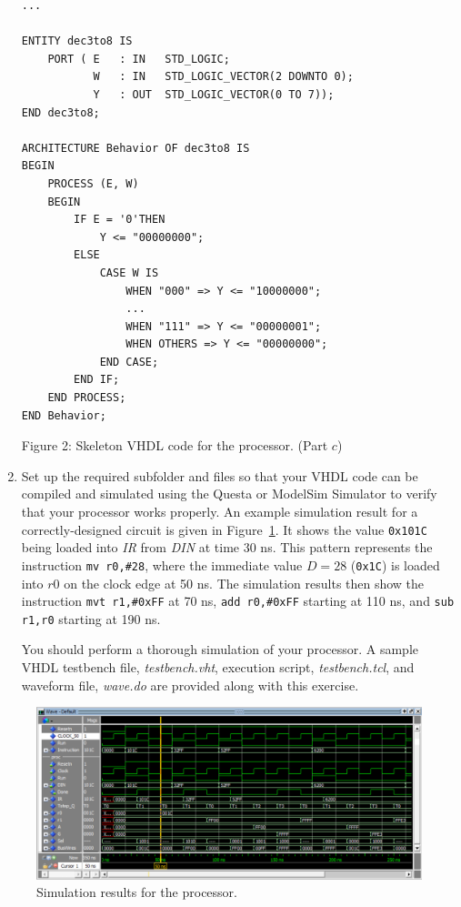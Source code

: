 \documentclass[epsfig,10pt,fullpage]{article} \addtolength{\textwidth}{1.5in}
\begin{document}
\begin{enumerate}
\begin{center}
\begin{minipage}[t]{15 cm}
\begin{lstlisting}[name=proc]
...

ENTITY dec3to8 IS
    PORT ( E   : IN   STD_LOGIC;
           W   : IN   STD_LOGIC_VECTOR(2 DOWNTO 0);
           Y   : OUT  STD_LOGIC_VECTOR(0 TO 7));
END dec3to8;

ARCHITECTURE Behavior OF dec3to8 IS
BEGIN
    PROCESS (E, W)
    BEGIN
        IF E = '0'THEN
            Y <= "00000000";
        ELSE
            CASE W IS
                WHEN "000" => Y <= "10000000";
                ...
                WHEN "111" => Y <= "00000001";
                WHEN OTHERS => Y <= "00000000";
            END CASE;
        END IF;
    END PROCESS;
END Behavior;
\end{lstlisting}
\end{minipage}
\end{center}

\begin{center}
Figure 2: Skeleton VHDL code for the processor. (Part $c$)
\end{center}

\item Set up the required subfolder and files so that your VHDL code can be compiled and 
simulated using the Questa or ModelSim Simulator to verify that your processor works properly. 
An example simulation result for a correctly-designed circuit 
is given in Figure~\ref{fig:fig3}.  It shows the value \texttt{0x101C} being loaded into {\it IR} 
from {\it DIN} at time 30 ns. This pattern represents the instruction \texttt{mv r0,\#28}, 
where the immediate value $D = 28$ (\texttt{0x1C}) is loaded into $r0$ on the clock edge at 50 ns. 
The simulation results then show the instruction \texttt{mvt~r1,\#0xFF} at 70 ns, 
\texttt{add r0,\#0xFF} starting at 110 ns, and \texttt{sub r1,r0} starting at 190 ns.

You should perform a thorough simulation of your processor. A 
sample VHDL testbench file, {\it testbench.vht}, execution script, {\it testbench.tcl}, 
and waveform file, {\it wave.do} are provided along with this exercise.
\end{enumerate}
\begin{figure}[H]
	\begin{center}
		\includegraphics[width=\textwidth]{figures/figure3.png}
	\end{center}
	\caption{Simulation results for the processor.}
	\label{fig:fig3}
\end{figure}
\end{document}
